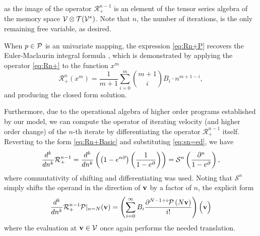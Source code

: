 as the image of the operator $\mathcal{R}^{n-1}_+$ is an element of the tensor series algebra of the memory space $\mathcal{V}\otimes \mathcal{T}(\mathcal{V}^*)$.
Note that $n$, the number of iterations, is the only remaining free variable, as desired.
\begin{remark}
  When $p\in\mathcal{P}$ is an univariate mapping, the expression \eqref{eq:Rn+P} recovers the Euler-Maclaurin integral formula \cite{apostol1999elementary}, which is demonstrated by applying the operator \eqref{eq:Rn+} to the function $x^m$
$$\mathcal{R}^n_+(x^m)=\frac{1}{m+1}\sum_{i=0}^m{m+1\choose i}B_i\cdot n^{m+1-i},$$
and producing the closed form solution.
\end{remark}
Furthermore, due to the operational algebra of higher order programs established by our model, we can compute the operator of iterating velocity (and higher order change) of the $n$-th iterate by differentiating the operator $\mathcal{R}^{n-1}_+$ itself. Reverting to the form \eqref{eq:Rn+Basic} and substituting \eqref{eq:sn=ed}, we have
\begin{equation}
  \frac{d^k}{dn^k}\mathcal{R}^{n-1}_+=\frac{d^k}{dn^k}\left(\left(1-e^{n\partial}\right)\left(\frac{1}{1-e^\partial}\right)\right)=\mathcal{S}^n\left(\frac{\partial^n}{1-e^\partial}\right),
   \end{equation}
where commutativity of shifting and differentiating was used. Noting that $\mathcal{S}^n$ simply shifts the operand in the direction of $\mathbf{v}$ by a factor of $n$, the explicit form 
\begin{equation}
        \frac{d^k}{dn^k}\mathcal{R}^{n-1}_+\mathcal{P}\vert_{n=N}(\mathbf{v})=\left(\sum\limits_{i=0}^{\infty}B_i\frac{\partial^{N-1+i}\mathcal{P}\left(N\mathbf{v}\right)}{i!}\right)\Big(\mathbf{v}\Big)
        \end{equation}
where the evaluation at $\mathbf{v}\in \mathcal{V}$ once again performs the needed translation.

